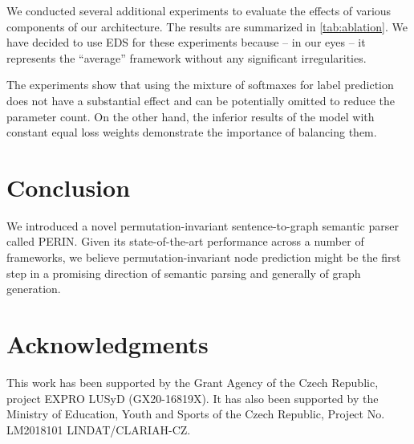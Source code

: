 \documentclass[11pt,a4paper]{article}
\begin{document}
We conducted several additional experiments to evaluate the effects of various components of our  architecture. The results are summarized in \autoref{tab:ablation}. We have decided to use EDS for these experiments because -- in our eyes -- it represents the ``average'' framework without any significant irregularities.

The experiments show that using the mixture of softmaxes for label prediction does not have a substantial effect and can be potentially omitted to reduce the parameter count. On the other hand, the inferior results of the model with constant equal loss weights demonstrate the importance of balancing them. \section{Conclusion}

We introduced a novel permutation-invariant sentence-to-graph semantic parser called PERIN. Given its state-of-the-art performance across a number of frameworks, we believe permutation-invariant node prediction might be the first step in a promising direction of semantic parsing and generally of graph generation. \vspace*{\fill}
\section*{Acknowledgments}

This work has been supported by the Grant Agency of the Czech Republic,
project EXPRO LUSyD (GX20-16819X). It has also been supported by the Ministry of Education, Youth and Sports of the Czech Republic, Project No. LM2018101 LINDAT/CLARIAH-CZ.

\clearpage 


\end{document}
